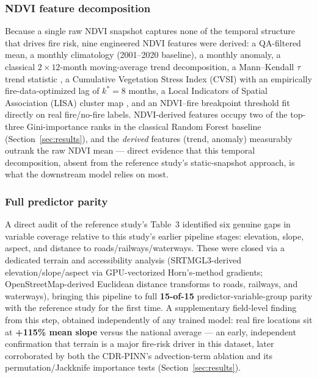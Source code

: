 \documentclass[journal]{IEEEtran}
\begin{document}
\subsubsection{NDVI feature decomposition}
Because a single raw NDVI snapshot captures none of the temporal structure that drives fire risk, nine engineered NDVI features were derived: a QA-filtered mean, a monthly climatology (2001--2020 baseline), a monthly anomaly, a classical $2\times12$-month moving-average trend decomposition, a Mann--Kendall $\tau$ trend statistic \cite{mann1945,kendall1975}, a Cumulative Vegetation Stress Index (CVSI) with an empirically fire-data-optimized lag of $k^{*}=8$ months, a Local Indicators of Spatial Association (LISA) cluster map \cite{anselin1995}, and an NDVI--fire breakpoint threshold fit directly on real fire/no-fire labels. NDVI-derived features occupy two of the top-three Gini-importance ranks in the classical Random Forest baseline (Section~\ref{sec:results}), and the \emph{derived} features (trend, anomaly) measurably outrank the raw NDVI mean --- direct evidence that this temporal decomposition, absent from the reference study's static-snapshot approach, is what the downstream model relies on most.

\subsubsection{Full predictor parity}
A direct audit of the reference study's Table~3 identified six genuine gaps in variable coverage relative to this study's earlier pipeline stages: elevation, slope, aspect, and distance to roads/railways/waterways. These were closed via a dedicated terrain and accessibility analysis (SRTMGL3-derived elevation/slope/aspect via GPU-vectorized Horn's-method gradients; OpenStreetMap-derived Euclidean distance transforms to roads, railways, and waterways), bringing this pipeline to full \textbf{15-of-15} predictor-variable-group parity with the reference study for the first time. A supplementary field-level finding from this step, obtained independently of any trained model: real fire locations sit at \textbf{+115\% mean slope} versus the national average --- an early, independent confirmation that terrain is a major fire-risk driver in this dataset, later corroborated by both the CDR-PINN's advection-term ablation and its permutation/Jackknife importance tests (Section~\ref{sec:results}).
\end{document}
